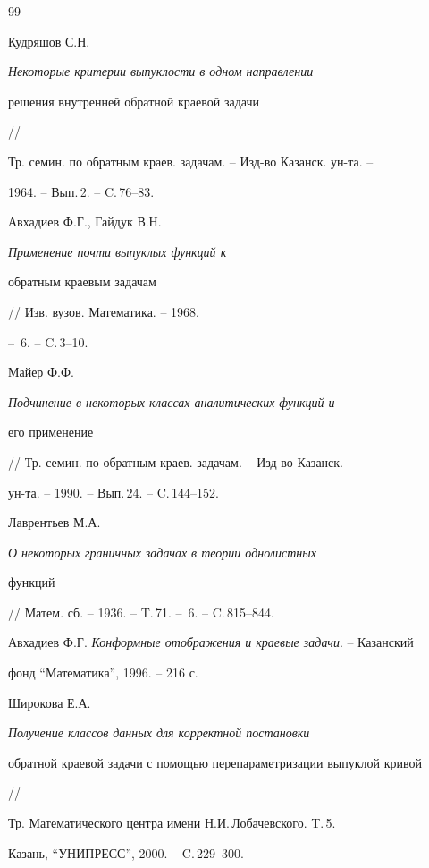 \begin{thebibliography}{99}


Кудряшов С.Н. {\em Некоторые критерии выпуклости в одном направлении


решения внутренней обратной краевой задачи} //


Тр. семин. по обратным краев. задачам. -- Изд-во Казанск. ун-та. --


1964. -- Вып.\,2. -- C.\,76--83.




Авхадиев Ф.Г., Гайдук В.Н. {\em Применение почти выпуклых функций к


обратным краевым задачам} // Изв. вузов. Математика. -- 1968.


-- \No\,6. -- C.\,3--10.




Майер Ф.Ф. {\em Подчинение в некоторых классах аналитических функций и


его применение} // Тр. семин. по обратным краев. задачам. -- Изд-во Казанск.


ун-та. -- 1990. -- Вып.\,24. -- C.\,144--152.




Лаврентьев М.А. {\em О некоторых граничных задачах в теории однолистных


функций} // Матем. сб. -- 1936. -- T.\,71. -- \No\,6. -- C.\,815--844.




Авхадиев Ф.Г. {\em Конформные отображения и краевые задачи}. -- Казанский


фонд ``Математика'', 1996. -- 216 с.




Широкова Е.А. {\em Получение классов данных для корректной постановки


обратной краевой задачи с помощью перепараметризации выпуклой кривой} //


Тр. Математического центра имени Н.И.\,Лобачевского. T.\,5.


Казань, ``УНИПРЕСС'', 2000. -- C.\,229--300.





\end{thebibliography}





\vskip 2cm












\label{end}








